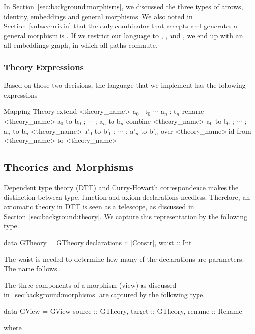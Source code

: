In Section~\ref{sec:background:morphisms}, we discussed the three types of arrows, identity, embeddings and general morphisms. We also noted in Section~\ref{subsec:mixin} that the only combinator that accepts and generates a general morphism is . If we restrict our language to , , and , we end up with an all-embeddings graph, in which all paths commute.

\subsubsection{Theory Expressions}
\label{sec:impl:expressions}
Based on those two decisions, the language that we implement has the following expressions
\begin{togcode}[mathescape]
Mapping
Theory {}
extend <theory_name> {a$_0$ : t$_0$ $\cdots$ a$_n$ : t$_n$}
rename <theory_name> {a$_0$ to b$_0$ ; $\cdots$ ; a$_n$ to b$_n$}
combine <theory_name> {a$_0$ to b$_0$ ; $\cdots$ ; a$_n$ to b$_n$}
        <theory_name> {a'$_0$ to b'$_0$ ; $\cdots$ ; a'$_n$ to b'$_n$}
    over <theory_name>
id from <theory_name> to <theory_name>     
\end{togcode} 


\subsection{Theories and Morphisms}
Dependent type theory (DTT) and Curry-Howarth correspondence makes the distinction between type, function and axiom declarations needless. Therefore, an axiomatic theory in DTT is seen as a telescope, as discussed in Section~\ref{sec:background:theory}. We capture this representation by the following type. 
\begin{hscode}
data GTheory = GTheory {
  declarations :: [Constr],
  waist        :: Int     }
\end{hscode}
The waist is needed to determine how many of the declarations are parameters. The name follows~\cite{alhassy2019}. 

The three components of a morphism (view) as discussed in~\ref{sec:background:morphisms} are captured by the following type. 
\begin{hscode}
data GView  = GView {
  source  :: GTheory,
  target  :: GTheory,
  rename :: Rename }  
\end{hscode}
where 

